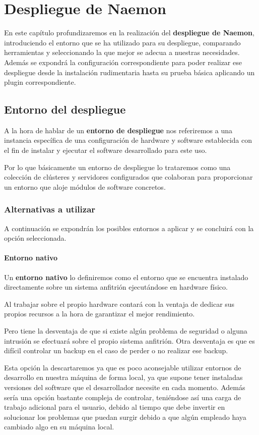 \chapter{Despliegue de Naemon} \label{ch:despliegue}
En este capítulo profundizaremos en la realización del \textbf{despliegue de Naemon}, introduciendo el entorno que se ha utilizado para su despliegue, comparando herramientas y seleccionando la que mejor se adecua a nuestras necesidades. Además se expondrá la configuración correspondiente para poder realizar ese despliegue desde la instalación rudimentaria hasta su prueba básica aplicando un plugin correspondiente.

\section{Entorno del despliegue}
A la hora de hablar de un \textbf{entorno de despliegue} nos referiremos a una instancia específica de una configuración de hardware y software establecida con el fin de instalar y ejecutar el software desarrollado para este uso.

Por lo que básicamente un entorno de despliegue lo trataremos como una colección de clústeres y servidores configurados que colaboran para proporcionar un entorno que aloje módulos de software concretos.

\subsection{Alternativas a utilizar}
A continuación se expondrán los posibles entornos a aplicar y se concluirá con la opción seleccionada.
\newpage
\subsubsection{Entorno nativo}
Un \textbf{entorno nativo} lo definiremos como el entorno que se encuentra instalado directamente sobre un sistema anfitrión ejecutándose en hardware físico.

Al trabajar sobre el propio hardware contará con la ventaja de dedicar sus propios recursos a la hora de garantizar el mejor rendimiento.

Pero tiene la desventaja de que si existe algún problema de seguridad o alguna intrusión se efectuará sobre el propio sistema anfitrión. Otra desventaja es que es difícil controlar un backup en el caso de perder o no realizar ese backup.

Esta opción la descartaremos ya que es poco aconsejable utilizar entornos de desarrollo en nuestra máquina de forma local, ya que supone tener instaladas versiones del software que el desarrollador necesite en cada momento. Además sería una opción bastante compleja de controlar, teniéndose así una carga de trabajo adicional para el usuario, debido al tiempo que debe invertir en solucionar los problemas que puedan surgir debido a que algún empleado haya cambiado algo en su máquina local.

